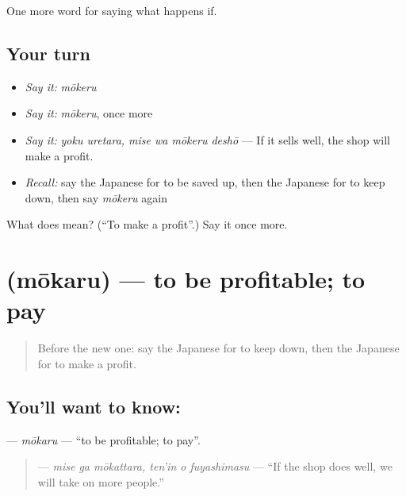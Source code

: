 \begin{grammarlens}[title={What you've built}]
One more word for saying what happens if.
\end{grammarlens}

\subsection*{Your turn}
\begin{itemize}
\raggedright
  \item \emph{Say it:} \emph{mōkeru}
  \item \emph{Say it:} \emph{mōkeru}, once more
  \item \emph{Say it:} \emph{yoku uretara, mise wa mōkeru deshō} — If it sells well, the shop will make a profit.
  \item \emph{Recall:} say the Japanese for to be saved up, then the Japanese for to keep down, then say \emph{mōkeru} again
\end{itemize}

\begin{tcolorbox}[breakable,colback=teal!4,colframe=teal!35!black,title={Before you move on}]
What does  mean? (\textquotedblleft{}To make a profit\textquotedblright{}.) Say it once more.
\end{tcolorbox}
\section[\texorpdfstring{\ja{もうかる} (mōkaru)}{もうかる (mōkaru)}]{ (mōkaru) — to be profitable; to pay}

\label{lesson:JA-C361-moukaru}



\begin{quote}
Before the new one: say the Japanese for to keep down, then the Japanese for to make a profit.
\end{quote}

\subsection*{You'll want to know: }
\textbf{} — \emph{mōkaru} — \textquotedblleft{}to be profitable; to pay\textquotedblright{}.

\begin{quote}
\textbf{  } — \emph{mise ga mōkattara, ten'in o fuyashimasu} — \textquotedblleft{}If the shop does well, we will take on more people.\textquotedblright{}
\end{quote}

